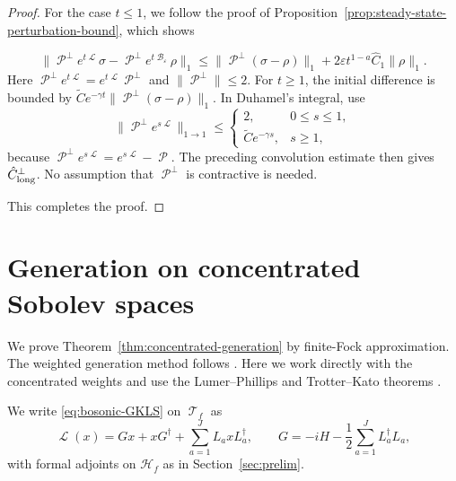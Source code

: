 \documentclass[11pt]{article}
\theoremstyle{myplain}
\theoremstyle{mydefinition}
\theoremstyle{remark}
\DeclareMathOperator{\cB}{\mathcal{B}}
\DeclareMathOperator{\cL}{\mathcal{L}}
\DeclareMathOperator{\cP}{\mathcal{P}}
\DeclareMathOperator{\cT}{\mathcal{T}}
\DeclareMathOperator{\1}{\mathds{1}}
\begin{document}
    \begin{proof}
        For the case $t \leq 1$, we follow the proof of Proposition~\ref{prop:steady-state-perturbation-bound}, which shows
        
        \begin{equation*}
            \|\cP^\perp e^{t\cL}\sigma-\cP^\perp e^{t\cB_\varepsilon}\rho\|_1
            \leq\|\cP^\perp(\sigma-\rho)\|_1
            +2\varepsilon t^{1-a}\hat C_1\|\rho\|_1.
        \end{equation*}
        Here $\cP^\perp e^{t\cL}=e^{t\cL}\cP^\perp$ and $\|\cP^\perp\|\leq2$. For $t\geq1$, the initial difference is bounded by $\widetilde C e^{-\gamma t}\|\cP^\perp(\sigma-\rho)\|_1$. In Duhamel's integral, use
        \begin{equation*}
            \|\cP^\perp e^{s\cL}\|_{1\to1}
            \leq\begin{cases}2,&0\leq s\leq1,\\
                \widetilde C e^{-\gamma s},&s\geq1,
            \end{cases}
        \end{equation*}
        because $\cP^\perp e^{s\cL}=e^{s\cL}-\cP$. The preceding convolution estimate then gives $\hat C_{\rm long}^{\perp}$. No assumption that $\cP^\perp$ is contractive is needed.
        
        This completes the proof.
    \end{proof}


\section{Generation on concentrated Sobolev spaces}\label{appx:concentrated-generation}
    
    We prove Theorem~\ref{thm:concentrated-generation} by finite-Fock approximation. The weighted generation method follows \cite{Gondolf.2024}. Here we work directly with the concentrated weights and use the Lumer--Phillips and Trotter--Kato theorems \cite[Thms.~II.3.15 and III.4.8]{Engel.2000}.

    We write \eqref{eq:bosonic-GKLS} on $\cT_f$ as
    \begin{equation}\label{eq:polynomial-core-generator}
        \cL(x) = Gx + xG^\dagger + \sum_{a=1}^{J} L_a xL_a^\dagger,
        \qquad
        G = -iH - \frac12 \sum_{a=1}^{J} L_a^\dagger L_a,
    \end{equation}
    with formal adjoints on $\mathcal H_f$ as in Section~\ref{sec:prelim}.
\end{document}

